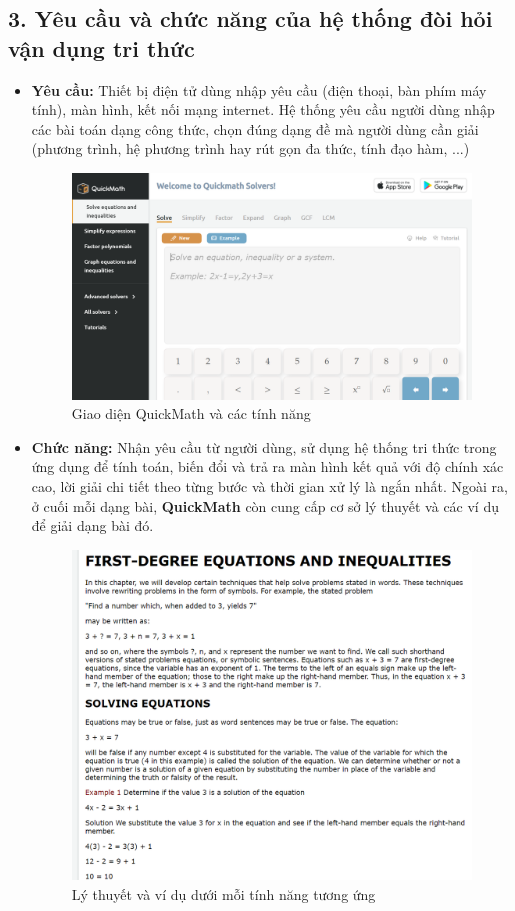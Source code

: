\documentclass{article}
\begin{document}
\subsection*{3. Yêu cầu và chức năng của hệ thống đòi hỏi vận dụng tri thức}
\begin{itemize}
	\item \textbf{Yêu cầu:} Thiết bị điện tử dùng nhập yêu cầu (điện thoại, bàn phím máy tính), màn hình, kết nối mạng internet. Hệ thống yêu cầu người dùng nhập các bài toán dạng công thức, chọn đúng dạng đề mà người dùng cần giải (phương trình, hệ phương trình hay rút gọn đa thức, tính đạo hàm, ...)
	\begin{figure}
		\centering
		\includegraphics[width=0.7\linewidth]{quickmath1}
		\caption{Giao diện QuickMath và các tính năng}
		\label{fig:quickmath1}
	\end{figure}
	\item \textbf{Chức năng:} Nhận yêu cầu từ người dùng, sử dụng hệ thống tri thức trong ứng dụng để tính toán, biến đổi và trả ra màn hình kết quả với độ chính xác cao, lời giải chi tiết theo từng bước và thời gian xử lý là ngắn nhất. Ngoài ra, ở cuối mỗi dạng bài, \textbf{QuickMath} còn cung cấp cơ sở lý thuyết và các ví dụ để giải dạng bài đó.
	\begin{figure}
		\centering
		\includegraphics[width=0.7\linewidth]{quickmath3}
		\caption{Lý thuyết và ví dụ dưới mỗi tính năng tương ứng}
		\label{fig:quickmath3}
	\end{figure}
\end{itemize}
\end{document}
